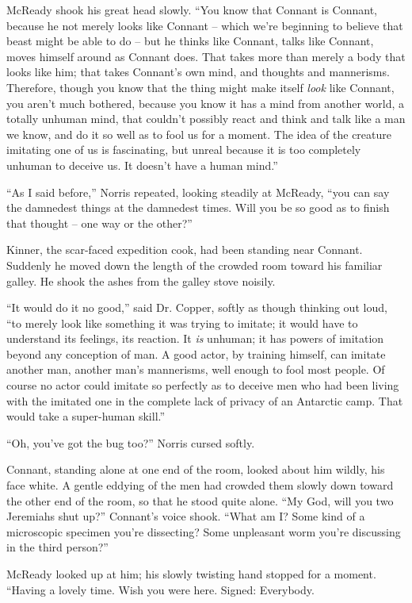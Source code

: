 \documentclass[letterpaper,openany,12pt]{memoir}		%
\begin{document}
McReady shook his great head slowly. ``You know that Connant is Connant, because
he not merely looks like Connant -- which we're beginning to believe that beast
might be able to do -- but he thinks like Connant, talks like Connant, moves
himself around as Connant does. That takes more than merely a body that looks
like him; that takes Connant's own mind, and thoughts and mannerisms. Therefore,
though you know that the thing might make itself \emph{look} like Connant, you
aren't much bothered, because you know it has a mind from another world, a
totally unhuman mind, that couldn't possibly react and think and talk like a man
we know, and do it so well as to fool us for a moment. The idea of the creature
imitating one of us is fascinating, but unreal because it is too completely
unhuman to deceive us. It doesn't have a human mind.''

``As I said before,'' Norris repeated, looking steadily at McReady, ``you can
say the damnedest things at the damnedest times. Will you be so good as to
finish that thought -- one way or the other?''

Kinner, the scar-faced expedition cook, had been standing near Connant. Suddenly
he moved down the length of the crowded room toward his familiar galley. He
shook the ashes from the galley stove noisily.

``It would do it no good,'' said Dr. Copper, softly as though thinking out loud,
``to merely look like something it was trying to imitate; it would have to
understand its feelings, its reaction. It \emph{is} unhuman; it has powers of
imitation beyond any conception of man. A good actor, by training himself, can
imitate another man, another man's mannerisms, well enough to fool most people.
Of course no actor could imitate so perfectly as to deceive men who had been
living with the imitated one in the complete lack of privacy of an Antarctic
camp. That would take a super-human skill.''

``Oh, you've got the bug too?'' Norris cursed softly.

Connant, standing alone at one end of the room, looked about him wildly, his
face white. A gentle eddying of the men had crowded them slowly down toward the
other end of the room, so that he stood quite alone. ``My God, will you two
Jeremiahs shut up?'' Connant's voice shook. ``What am I? Some kind of a
microscopic specimen you're dissecting? Some unpleasant worm you're discussing
in the third person?''

McReady looked up at him; his slowly twisting hand stopped for a moment.
``Having a lovely time. Wish you were here. Signed: Everybody.
\end{document}
